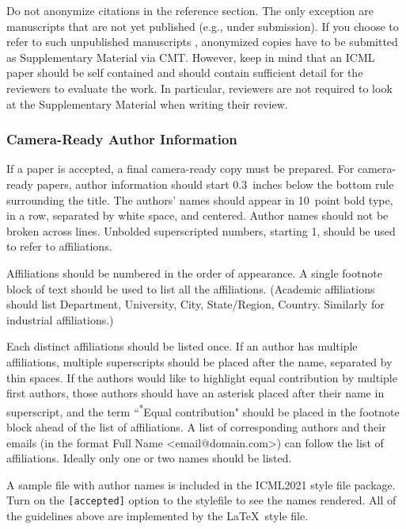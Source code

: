 \documentclass{article}
\begin{document}
Do not anonymize citations in the reference section. The only exception are manuscripts that are
not yet published (e.g., under submission). If you choose to refer to
such unpublished manuscripts \cite{anonymous}, anonymized copies have
to be submitted
as Supplementary Material via CMT\@. However, keep in mind that an ICML
paper should be self contained and should contain sufficient detail
for the reviewers to evaluate the work. In particular, reviewers are
not required to look at the Supplementary Material when writing their
review.

\subsubsection{Camera-Ready Author Information}
\label{final author}

If a paper is accepted, a final camera-ready copy must be prepared.
%
For camera-ready papers, author information should start 0.3~inches below the
bottom rule surrounding the title. The authors' names should appear in 10~point
bold type, in a row, separated by white space, and centered. Author names should
not be broken across lines. Unbolded superscripted numbers, starting 1, should
be used to refer to affiliations.

Affiliations should be numbered in the order of appearance. A single footnote
block of text should be used to list all the affiliations. (Academic
affiliations should list Department, University, City, State/Region, Country.
Similarly for industrial affiliations.)

Each distinct affiliations should be listed once. If an author has multiple
affiliations, multiple superscripts should be placed after the name, separated
by thin spaces. If the authors would like to highlight equal contribution by
multiple first authors, those authors should have an asterisk placed after their
name in superscript, and the term ``\textsuperscript{*}Equal contribution"
should be placed in the footnote block ahead of the list of affiliations. A
list of corresponding authors and their emails (in the format Full Name
\textless{}email@domain.com\textgreater{}) can follow the list of affiliations.
Ideally only one or two names should be listed.

A sample file with author names is included in the ICML2021 style file
package. Turn on the \texttt{[accepted]} option to the stylefile to
see the names rendered. All of the guidelines above are implemented
by the \LaTeX\ style file.
\end{document}
